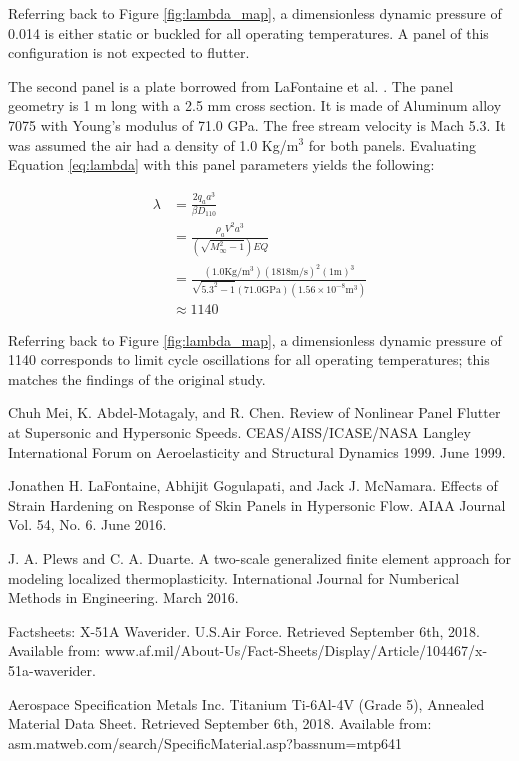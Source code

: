 \documentclass[a4paper, 12pt]{article}
\begin{document}
\noindent
Referring back to Figure \ref{fig:lambda_map}, 
a dimensionless dynamic pressure of 0.014 
is either static or buckled for all operating temperatures.
A panel of this configuration is not expected to flutter.

The second panel is a plate borrowed from LaFontaine et al. \cite{bib:LaFontaine}.
The panel geometry is 1 m long with a 2.5 mm cross section.
It is made of Aluminum alloy 7075 with Young's modulus of 71.0 GPa.
The free stream velocity is Mach 5.3.
It was assumed the air had a density of 1.0 Kg/m$^3$ for both panels.
Evaluating Equation \ref{eq:lambda} with this panel
parameters yields the following:

\begin{align*}
\lambda 
 &= \frac{2 q_a a^3}{\beta D_{110}} \\
 &= \frac{\rho_a V^2 a^3}{ (\sqrt{M_{\infty}^2 -1}) E Q} \\
 &= \frac{(1.0 \text{Kg}/\text{m}^3) (1818 \text{m}/\text{s})^2 (1 \text{m})^3}{ \sqrt{5.3^2 -1} (71.0 \text{GPa}) (1.56\times 10^{-8} \text{m}^3)} \\
 &\approx 1140
\end{align*}

\noindent
Referring back to Figure \ref{fig:lambda_map}, 
a dimensionless dynamic pressure of 1140
corresponds to limit cycle oscillations for all operating temperatures;
this matches the findings of the original study.


\newpage
\begin{thebibliography}{99}
Chuh Mei,
K. Abdel-Motagaly,
and R. Chen.
Review of Nonlinear Panel Flutter at Supersonic and Hypersonic Speeds.
CEAS/AISS/ICASE/NASA Langley International Forum on Aeroelasticity and Structural Dynamics 1999. 
June 1999.

Jonathen H. LaFontaine,
Abhijit Gogulapati,
and Jack J. McNamara.
Effects of Strain Hardening on Response of Skin Panels in Hypersonic Flow.
AIAA Journal Vol. 54, No. 6.
June 2016.

J. A. Plews
and C. A. Duarte.
A two-scale generalized finite element approach for modeling localized thermoplasticity.
International Journal for Numberical Methods in Engineering.
March 2016.

Factsheets: X-51A Waverider.
U.S.Air Force. 
Retrieved September 6th, 2018. 
Available from: www.af.mil/About-Us/Fact-Sheets/Display/Article/104467/x-51a-waverider.

Aerospace Specification Metals Inc.
Titanium Ti-6Al-4V (Grade 5), Annealed Material Data Sheet.
Retrieved September 6th, 2018.
Available from: asm.matweb.com/search/SpecificMaterial.asp?bassnum=mtp641

\end{thebibliography}
\end{document}
